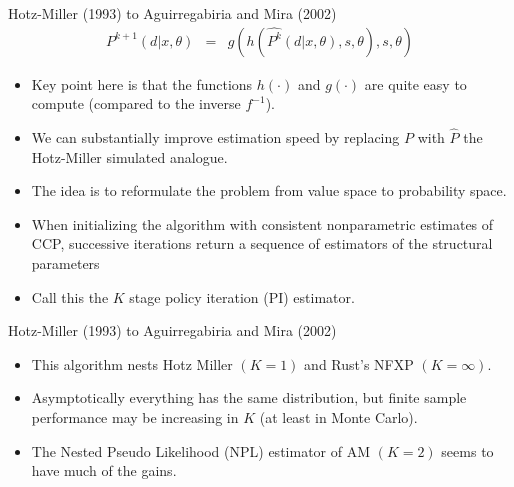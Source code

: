 \documentclass[xcolor=pdftex,dvipsnames,table,mathserif,aspectratio=169]{beamer}
\begin{document}
\begin{frame}{Hotz-Miller (1993) to Aguirregabiria and Mira (2002)}
\begin{eqnarray*}
P^{k+1}(d | x,\theta) &=& g(h(\hat{P^{k}}(d | x, \theta),s ,\theta),s,\theta)
\end{eqnarray*}
\vspace{-0.5cm}
\begin{itemize}
\item Key point here is that the functions $h(\cdot)$ and $g(\cdot)$ are quite easy to compute (compared to the inverse $f^{-1}$).
\item We can substantially improve estimation speed by replacing $P$ with $\hat{P}$ the Hotz-Miller simulated analogue.
\item The idea is to reformulate the problem from \alert{value space} to \alert{probability space}.
\item When initializing the algorithm with consistent nonparametric estimates of CCP, successive iterations return a sequence of estimators of the structural parameters
\item Call this the $K$ stage policy iteration (PI) estimator.
\end{itemize}
\end{frame}

\begin{frame}{Hotz-Miller (1993) to Aguirregabiria and Mira (2002)}
\begin{itemize}
\item This algorithm nests Hotz Miller $(K=1)$ and Rust's NFXP $(K=\infty)$.
\item Asymptotically everything has the same distribution, but finite sample performance may be increasing in $K$ (at least in Monte Carlo).
\item The Nested Pseudo Likelihood (NPL) estimator of AM $(K=2)$ seems to have much of the gains.
\end{itemize}
\end{frame}
\end{document}
